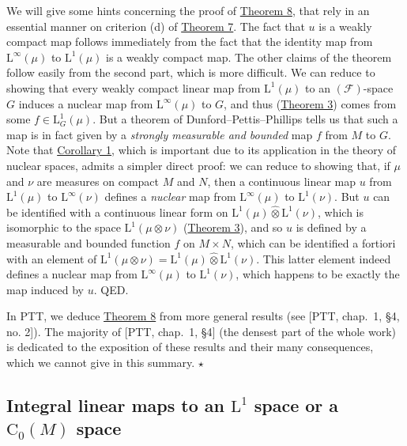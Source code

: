 \documentclass[british]{article}
\newcommand{\oldpage}[1]{\marginpar{\footnotesize$\Big\vert$ \textit{p.~#1}}}
\begin{document}
We will give some hints concerning the proof of
\hyperref[section-1-theorem-8]{Theorem 8}, that rely in an essential
manner on criterion (d) of \hyperref[section-1-theorem-7]{Theorem 7}.
The fact that \(u\) is a weakly compact map follows immediately from the
fact that the identity map from \(\mathrm{L}^\infty(\mu)\) to
\(\mathrm{L}^1(\mu)\) is a weakly compact map. The other claims of the
theorem follow easily from the second part, which is more difficult. We
can reduce to showing that every weakly compact linear map from
\(\mathrm{L}^1(\mu)\) to an \((\mathscr{F})\)-space \(G\) induces a
nuclear map from \(\mathrm{L}^\infty(\mu)\) to \(G\), and thus
(\hyperref[section-1-theorem-3]{Theorem 3}) comes from some
\(f\in\mathrm{L}^1_G(\mu)\). But a theorem of Dunford--Pettis--Phillips
tells us that such a map is in fact given by a \emph{strongly measurable
and bounded} map \(f\) from \(M\) to \(G\). Note that
\hyperref[section-1-corollary-1]{Corollary 1}, which is important due to
its application in the theory of nuclear spaces, admits a simpler direct
proof: we can reduce to showing that, if \(\mu\) and \(\nu\) are
measures on compact \(M\) and \(N\), then a continuous linear map \(u\)
from \(\mathrm{L}^1(\mu)\) to \(\mathrm{L}^\infty(\nu)\) defines a
\emph{nuclear} map from \(\mathrm{L}^\infty(\mu)\) to
\(\mathrm{L}^1(\nu)\). But \(u\) can be identified with a continuous
linear form on \(\mathrm{L}^1(\mu)\hat{\otimes}\mathrm{L}^1(\nu)\),
which is isomorphic to the space \(\mathrm{L}^1(\mu\otimes\nu)\)
(\hyperref[section-1-theorem-3]{Theorem 3}), and so \(u\) is defined by
a measurable and bounded function \(f\) on \(M\times N\), which can be
identified a fortiori with an element of
\(\mathrm{L}^1(\mu\otimes\nu)=\mathrm{L}^1(\mu)\hat{\otimes}\mathrm{L}^1(\nu)\).
This latter element indeed defines a nuclear map from
\(\mathrm{L}^\infty(\mu)\) to \(\mathrm{L}^1(\nu)\), which happens to be
exactly the map induced by \(u\). QED.

\oldpage{91}

In PTT, we deduce \hyperref[section-1-theorem-8]{Theorem 8} from more
general results (see {[}PTT, chap.~1, §4, no. 2{]}). The majority of
{[}PTT, chap.~1, §4{]} (the densest part of the whole work) is dedicated
to the exposition of these results and their many consequences, which we
cannot give in this summary. \(\star\)

\subsection{\texorpdfstring{Integral linear maps to an \(\mathrm{L}^1\)
space or a \(\mathrm{C}_0(M)\)
space}{Integral linear maps to an \textbackslash mathrm\{L\}\^{}1 space or a \textbackslash mathrm\{C\}\_0(M) space}}\label{section-1.9}
\end{document}
